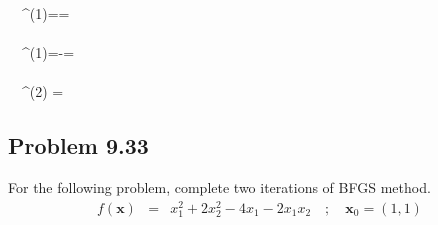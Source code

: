 \documentclass[]{report}
\begin{document}
\begin{program}
\quad \quad \ \ ^{(1)}==\left[\begin{array}{cc}-0.0092&0.0849\\0.0849&-0.7836\end{array}\right]\\~  \\
\quad \quad \ \ ^{(1)}=-=\left[\begin{array}{cc}0.5888&-0.4210\\-0.4210 & 0.3010\end{array}\right]\\~  \\
\quad \quad \ \  ^{(2)} =\left[\begin{array}{cc}    1.4696 &   0.0439\\-0.7161& -0.0726\end{array}\right]
\end{program}
\subsection*{Problem 9.33}
For the following problem, complete two iterations of BFGS method.
\begin{eqnarray*}
f\left(\mathbf x\right)&=&x_1^2+2x_2^2-4x_1-2x_1x_2 \quad ; \quad \mathbf{x}_0=\left(1,1\right)
\end{eqnarray*}
\end{document}
